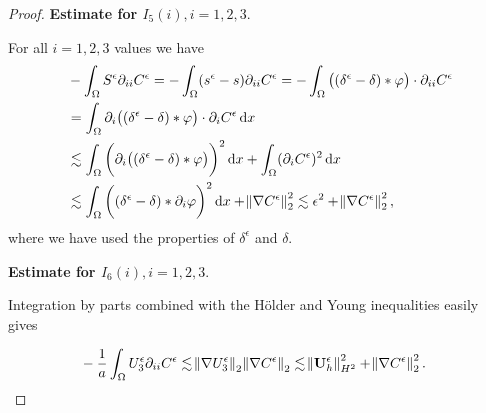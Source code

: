 \documentclass[12pt]{report}
\numberwithin{theorem}{chapter}
\numberwithin{corollary}{chapter}
\numberwithin{lemma}{chapter}
\numberwithin{remark}{chapter}
\numberwithin{definition}{chapter}
\numberwithin{prop}{chapter}
\newcommand*\diff{\mathop{}\!\mathrm{d}}
\begin{document}
\begin{proof}
\bigskip

\textbf{Estimate for $I_5 (i), i = 1,2,3.$}

For all $i = 1,2,3$ values we have
%
\begin{equation}
  \begin{split}
    & - \int_\Omega S^\epsilon \partial_{ii} C^\epsilon = - \int_\Omega (s^\epsilon - s) \partial_{ii} C^\epsilon  = - \int_\Omega \big ( (\delta^\epsilon - \delta ) \ast \varphi \big ) \cdot \partial_{ii} C^\epsilon \\
    & = \int_\Omega \partial_i \big ( (\delta^\epsilon - \delta ) \ast \varphi \big ) \cdot \partial_i C^\epsilon \diff x \\
    & \lesssim \int_\Omega \bigg( \partial_i \big ( (\delta^\epsilon - \delta ) \ast \varphi \big ) \bigg ) ^2 \diff x + \int_\Omega (\partial_i C^\epsilon)^2 \diff x \\
    & \lesssim \int_\Omega \bigg ( (\delta^\epsilon - \delta ) \ast \partial_i \varphi \bigg ) ^2 \diff x + \norm{\nabla C^\epsilon}_2^2 \lesssim \epsilon^2 + \norm{\nabla C^\epsilon}_2^2,
  \end{split}
\end{equation}
%
where we have used the properties of $\delta^\epsilon$ and $\delta.$

\bigskip

\textbf{Estimate for $I_6 (i), i = 1,2,3.$}

Integration by parts combined with the H\"older and Young inequalities easily gives

\begin{equation}
  \begin{split}
    & - \frac{1}{a} \int_\Omega U_3^\epsilon \partial_{ii} C^\epsilon \lesssim \norm{\nabla U_3^\epsilon}_2 \norm{\nabla C^\epsilon}_2 \lesssim \norm{\mathbf{U}_h^\epsilon}_{H^2}^2 + \norm{\nabla C^\epsilon}_2^2.
  \end{split}
\end{equation}

\bigskip


\end{proof}
\end{document}
